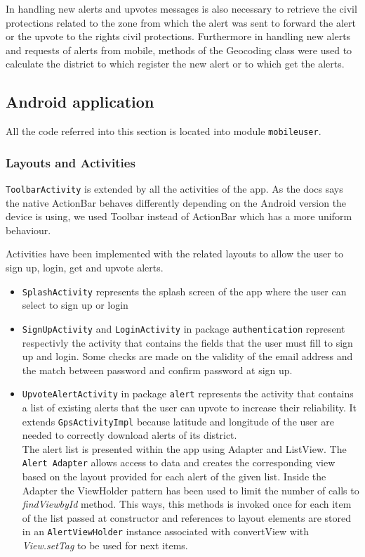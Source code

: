 \documentclass[a4paper,12pt]{report}
\begin{document}
In handling new alerts and upvotes messages is also necessary to retrieve the civil protections related to the zone from which the alert was sent to forward the alert or the upvote to the rights civil protections. Furthermore in handling new alerts and requests of alerts from mobile, methods of the Geocoding class were used to calculate the district to which register the new alert or to which get the alerts.

\subsection{Android application}

All the code referred into this section is located into module \texttt{mobileuser}.

\subsubsection{Layouts and Activities}
\texttt{ToolbarActivity} is extended by all the activities of the app. As the docs says the native ActionBar behaves differently depending on the Android version the device is using, we used Toolbar instead of ActionBar which has a more uniform behaviour.

Activities have been implemented with the related layouts to allow the user to sign up, login, get and upvote alerts.
\begin{itemize}
\item \texttt{SplashActivity} represents the splash screen of the app where the user can select to sign up or login
\item \texttt{SignUpActivity} and \texttt{LoginActivity} in package \texttt{authentication} represent respectivly the activity that contains the fields that the user must fill to sign up and login. Some checks are made on the validity of the email address and the match between password and confirm password at sign up.
\item \texttt{UpvoteAlertActivity} in package \texttt{alert} represents the activity that contains a list of existing alerts that the user can upvote to increase their reliability. It extends \texttt{GpsActivityImpl} because latitude and longitude of the user are needed to correctly download alerts of its district. \\
The alert list is presented within the app using Adapter and ListView. The \texttt{Alert Adapter} allows access to data and creates the corresponding view based on the layout provided for each alert of the given list. Inside the Adapter the ViewHolder pattern has been used to limit the number of calls to \textit{findViewbyId} method. This ways, this methods is invoked once for each item of the list passed at constructor and references to layout elements are stored in an \texttt{AlertViewHolder} instance associated with convertView with \textit{View.setTag} to be used for next items.
\end{itemize}
\end{document}
